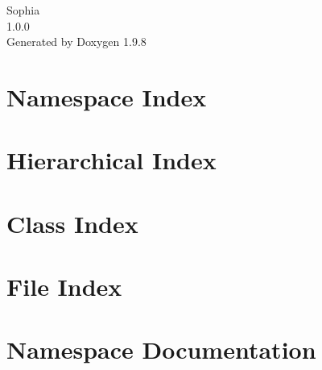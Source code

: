 \documentclass[twoside]{book}
\newcommand{\+}{\discretionary{\mbox{\scriptsize$\hookleftarrow$}}{}{}}
\newcommand{\clearemptydoublepage}{%
    \newpage{\pagestyle{empty}\cleardoublepage}%
  }
\begin{document}
  \raggedbottom
    \hypersetup{pageanchor=false,
                bookmarksnumbered=true,
                pdfencoding=unicode
               }
  \begin{titlepage}
  \vspace*{7cm}
  \begin{center}%
  {\Large Sophia}\\
  [1ex]\large 1.\+0.\+0 \\
  \vspace*{1cm}
  {\large Generated by Doxygen 1.9.8}\\
  \end{center}
  \end{titlepage}
  \clearemptydoublepage
  \tableofcontents
  \clearemptydoublepage
  \hypersetup{pageanchor=true}
\chapter{Namespace Index}

\chapter{Hierarchical Index}

\chapter{Class Index}

\chapter{File Index}

\chapter{Namespace Documentation}











\end{document}
